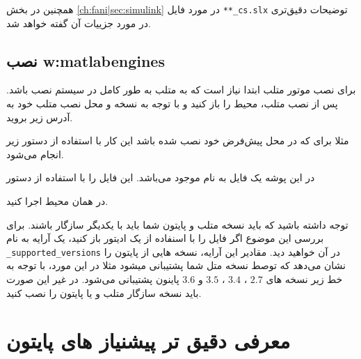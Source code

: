همچنین در بخش  
\ref{ch:fani|sec:simulink}
در مورد فایل \texttt{**\_cs.slx} توضیحات دقیق‌تری در مورد جزییات آن گفته خواهد شد.





\subsection{نصب
\glspl{w:matlabengine}
}
برای نصب موتور متلب ابتدا نیاز است که به متلب به طور کامل در سیستم نصب باشد. پس از نصب متلب، محیط  را باز کنید و با توجه به نسخه و محل نصب متلب خود به آدرس زیر بروید.

\begin{center}
\end{center}

مثلا برای  که در محل پیش‌فرض خود نصب شده باشد این کار با استفاده از دستور زیر انجام می‌شود.

\begin{center}
\end{center}

در این پوشه یک فایل به نام  موجود می‌باشد. این فایل را با استفاده از دستور 

\begin{center}
\end{center}

در همان محیط  اجرا کنید.

\begin{note}
	توجه داشته باشید که باید نسخه متلب و پایتون شما باید با یکدیگر سازگار باشند. برای بررسی این موضوع اگر فایل  را با اسنفاده از یک ادیتور باز کنید، یک آرایه به نام \texttt{\_supported\_versions} در آن خواهید دید. مقادیر این آرایه، نسخه هایی از پایتون را نشان می‌دهد که توصط نسخه متل شما پشتیبانی میشود مثلا در این مورد، با توجه به خط زیر نسخه های $2.7$ ، $3.4$ ، $3.5$ و $3.6$ پاینون پشتیبانی می‌شود. در غیر این صورت باید نسخه سازگار متلب و یا پایتون را نصب کنید.
	\begin{center}
	\end{center}
\end{note}

\section{معرفی دقیق تر پیشنیاز های پایتون}\label{ch:req|sec:python-req}
